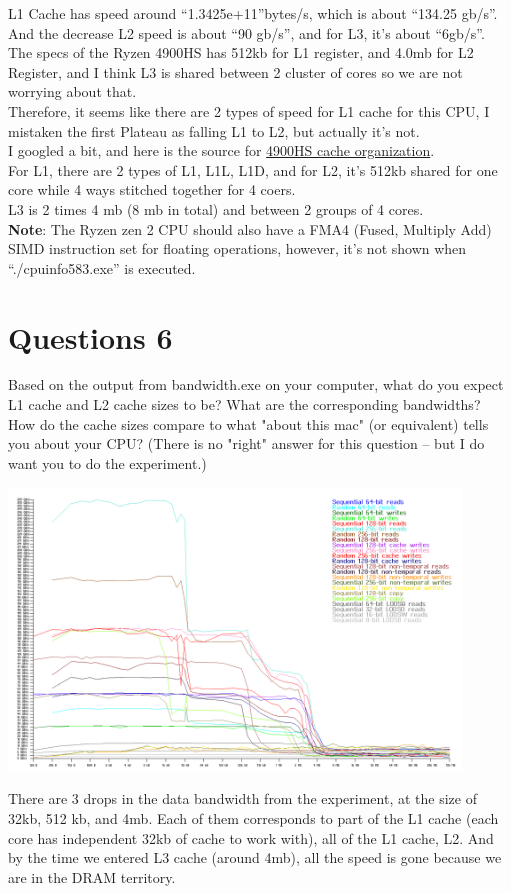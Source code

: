 \documentclass[]{article}
\begin{document}
    L1 Cache has speed around ``1.3425e+11''bytes/s, which is about ``134.25 gb/s''. And the decrease L2 speed is about ``90 gb/s'', and for L3, it's about ``6gb/s''. 
    \\[1.1em]
    The specs of the Ryzen 4900HS has 512kb for L1 register, and 4.0mb for L2 Register, and I think L3 is shared between 2 cluster of cores so we are not worrying about that. 
    \\[1.1em]
    Therefore, it seems like there are 2 types of speed for L1 cache for this CPU, I mistaken the first Plateau as falling L1 to L2, but actually it's not. 
    \\[1.1em]
    I googled a bit, and here is the source for \href{https://en.wikichip.org/wiki/amd/ryzen_9/4900hs}{4900HS cache organization}. 
    \\[1.1em]
    For L1, there are 2 types of L1, L1L, L1D, and for L2, it's 512kb shared for one core while 4 ways stitched together for 4 coers. 
    \\[1.1em]
    L3 is 2 times 4 mb (8 mb in total) and between 2 groups of 4 cores. 
    \\[1.1em]
    \textbf{Note}: The Ryzen zen 2 CPU should also have a FMA4 (Fused, Multiply Add) SIMD instruction set for floating operations, however, it's not shown when ``./cpuinfo583.exe'' is executed. 

\section*{Questions 6}
    Based on the output from bandwidth.exe on your computer, what do you expect L1 cache and L2 cache sizes to be?  What are the corresponding bandwidths?   How do the cache sizes compare to what "about this mac" (or equivalent) tells you about your CPU?  (There is no "right" answer for this question -- but I do want you to do the experiment.)
    \\
    \begin{center}
        \includegraphics[width=12cm]{bandwidth.png}
    \end{center}
    There are 3 drops in the data bandwidth from the experiment, at the size of 32kb, 512 kb, and 4mb. Each of them corresponds to part of the L1 cache (each core has independent 32kb of cache to work with), all of the L1 cache, L2. And by the time we entered L3 cache (around 4mb), all the speed is gone because we are in the DRAM territory. 
\end{document}
